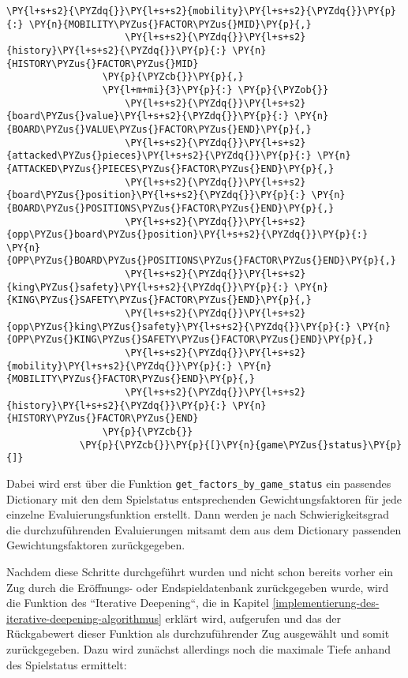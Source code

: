 \begin{Verbatim}[commandchars=\\\{\}]
                     \PY{l+s+s2}{\PYZdq{}}\PY{l+s+s2}{mobility}\PY{l+s+s2}{\PYZdq{}}\PY{p}{:} \PY{n}{MOBILITY\PYZus{}FACTOR\PYZus{}MID}\PY{p}{,}
                     \PY{l+s+s2}{\PYZdq{}}\PY{l+s+s2}{history}\PY{l+s+s2}{\PYZdq{}}\PY{p}{:} \PY{n}{HISTORY\PYZus{}FACTOR\PYZus{}MID}
                 \PY{p}{\PYZcb{}}\PY{p}{,}
                 \PY{l+m+mi}{3}\PY{p}{:} \PY{p}{\PYZob{}}
                     \PY{l+s+s2}{\PYZdq{}}\PY{l+s+s2}{board\PYZus{}value}\PY{l+s+s2}{\PYZdq{}}\PY{p}{:} \PY{n}{BOARD\PYZus{}VALUE\PYZus{}FACTOR\PYZus{}END}\PY{p}{,}
                     \PY{l+s+s2}{\PYZdq{}}\PY{l+s+s2}{attacked\PYZus{}pieces}\PY{l+s+s2}{\PYZdq{}}\PY{p}{:} \PY{n}{ATTACKED\PYZus{}PIECES\PYZus{}FACTOR\PYZus{}END}\PY{p}{,}
                     \PY{l+s+s2}{\PYZdq{}}\PY{l+s+s2}{board\PYZus{}position}\PY{l+s+s2}{\PYZdq{}}\PY{p}{:} \PY{n}{BOARD\PYZus{}POSITIONS\PYZus{}FACTOR\PYZus{}END}\PY{p}{,}
                     \PY{l+s+s2}{\PYZdq{}}\PY{l+s+s2}{opp\PYZus{}board\PYZus{}position}\PY{l+s+s2}{\PYZdq{}}\PY{p}{:} \PY{n}{OPP\PYZus{}BOARD\PYZus{}POSITIONS\PYZus{}FACTOR\PYZus{}END}\PY{p}{,}
                     \PY{l+s+s2}{\PYZdq{}}\PY{l+s+s2}{king\PYZus{}safety}\PY{l+s+s2}{\PYZdq{}}\PY{p}{:} \PY{n}{KING\PYZus{}SAFETY\PYZus{}FACTOR\PYZus{}END}\PY{p}{,}
                     \PY{l+s+s2}{\PYZdq{}}\PY{l+s+s2}{opp\PYZus{}king\PYZus{}safety}\PY{l+s+s2}{\PYZdq{}}\PY{p}{:} \PY{n}{OPP\PYZus{}KING\PYZus{}SAFETY\PYZus{}FACTOR\PYZus{}END}\PY{p}{,}
                     \PY{l+s+s2}{\PYZdq{}}\PY{l+s+s2}{mobility}\PY{l+s+s2}{\PYZdq{}}\PY{p}{:} \PY{n}{MOBILITY\PYZus{}FACTOR\PYZus{}END}\PY{p}{,}
                     \PY{l+s+s2}{\PYZdq{}}\PY{l+s+s2}{history}\PY{l+s+s2}{\PYZdq{}}\PY{p}{:} \PY{n}{HISTORY\PYZus{}FACTOR\PYZus{}END}
                 \PY{p}{\PYZcb{}}
             \PY{p}{\PYZcb{}}\PY{p}{[}\PY{n}{game\PYZus{}status}\PY{p}{]}
\end{Verbatim}

    Dabei wird erst über die Funktion
\texttt{get\_factors\_by\_game\_status} ein passendes Dictionary mit den
dem Spielstatus entsprechenden Gewichtungsfaktoren für jede einzelne
Evaluierungsfunktion erstellt. Dann werden je nach Schwierigkeitsgrad
die durchzuführenden Evaluierungen mitsamt dem aus dem Dictionary
passenden Gewichtungsfaktoren zurückgegeben.

Nachdem diese Schritte durchgeführt wurden und nicht schon bereits
vorher ein Zug durch die Eröffnungs- oder Endspieldatenbank
zurückgegeben wurde, wird die Funktion des ``Iterative Deepening``, die in
Kapitel \ref{implementierung-des-iterative-deepening-algorithmus} erklärt wird, aufgerufen und das der Rückgabewert dieser
Funktion als durchzuführender Zug ausgewählt und somit zurückgegeben.
Dazu wird zunächst allerdings noch die maximale Tiefe anhand des
Spielstatus ermittelt:

